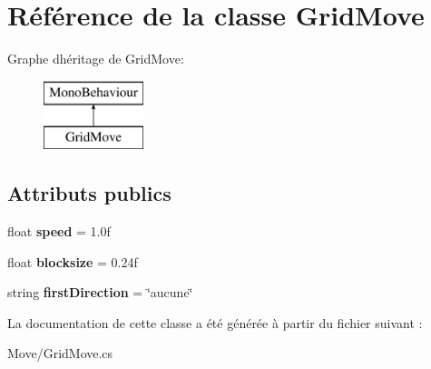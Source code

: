 \hypertarget{class_grid_move}{}\section{Référence de la classe Grid\+Move}
\label{class_grid_move}
Graphe d\textquotesingle{}héritage de Grid\+Move\+:\begin{figure}[H]
\begin{center}
\leavevmode
\includegraphics[height=2.000000cm]{class_grid_move}
\end{center}
\end{figure}
\subsection*{Attributs publics}
\begin{DoxyCompactItemize}
\item 
\mbox{\label{class_grid_move_acb81136481e8d127f6910eb627f9d824}} 
float {\bfseries speed} = 1.\+0f
\item 
\mbox{\label{class_grid_move_a2cf48c98cc973e87ede684a994be0b8d}} 
float {\bfseries blocksize} = 0.\+24f
\item 
\mbox{\label{class_grid_move_a8aab00834e6f2c01b784f43e38704df0}} 
string {\bfseries first\+Direction} = \char`\"{}aucune\char`\"{}
\end{DoxyCompactItemize}


La documentation de cette classe a été générée à partir du fichier suivant \+:\begin{DoxyCompactItemize}
\item 
Move/Grid\+Move.\+cs\end{DoxyCompactItemize}
